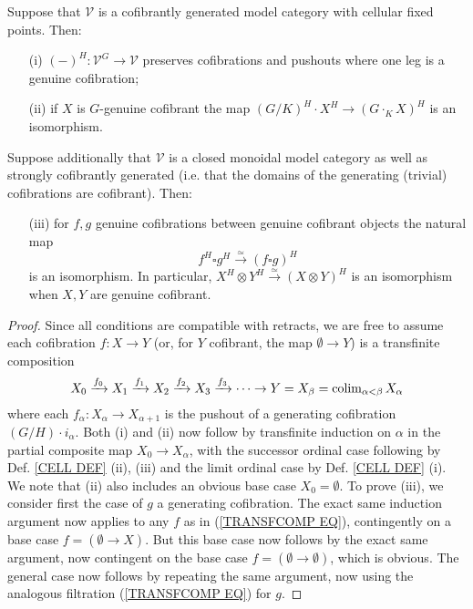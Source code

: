 \documentclass[a4paper,10pt]{article}%
\begin{document}
\begin{proposition}\label{STRONGCELL PROP}
	Suppose that $\mathcal{V}$ is a cofibrantly generated model category with cellular fixed points. Then:
	\begin{itemize}
		\item[(i)] $(\minus)^H \colon \mathcal{V}^G \to \mathcal{V}$ preserves cofibrations and pushouts where one leg
			 is a genuine cofibration;
		\item[(ii)] if $X$ is $G$-genuine cofibrant the map 
			$(G/K)^H \cdot X^H \to (G \cdot_K X)^H$ is an isomorphism.
	\end{itemize}
Suppose additionally that $\mathcal{V}$ is a 
closed monoidal model category
as well as strongly cofibrantly generated
(i.e. that the domains of the generating (trivial) cofibrations are cofibrant). Then:
	\begin{itemize}
		\item[(iii)] for $f,g$ genuine cofibrations between genuine cofibrant objects the natural map 
\[f^H \square g^H \xrightarrow{\simeq} (f \square g)^H\]
 is an isomorphism.
 In particular, $X^H \otimes Y^H \xrightarrow{\simeq} 
 (X \otimes Y)^H$ is an isomorphism when $X,Y$ are genuine cofibrant.
	\end{itemize}
\end{proposition}


\begin{proof}
Since all conditions are compatible with retracts, we are free to assume each cofibration $f\colon X \to Y$
(or, for $Y$ cofibrant, the map $\emptyset \to Y$)
is a transfinite composition
\begin{equation}\label{TRANSFCOMP EQ}
	X_0 \xrightarrow{f_0} 
	X_1 \xrightarrow{f_1}
	X_2 \xrightarrow{f_2}
	X_3 \xrightarrow{f_3} 
	\cdots
	\to Y = X_{\beta} = \operatorname{colim}_{\alpha < \beta} X_{\alpha}
\end{equation}
where each $f_{\alpha} \colon X_{\alpha} \to X_{\alpha+1}$
is the pushout of a generating cofibration
$(G/H) \cdot i_{\alpha}$. Both (i) and (ii) now follow by transfinite induction on $\alpha$ in the partial composite map
$X_0 \to X_{\alpha}$, with the successor ordinal case following by Def. \ref{CELL DEF} (ii), (iii) and the limit ordinal case by
Def. \ref{CELL DEF} (i). We note that (ii) also includes an obvious base case $X_0=\emptyset$.
To prove (iii), we consider first the case of $g$ a generating cofibration. The exact same induction argument now applies to any $f$ as in (\ref{TRANSFCOMP EQ}), contingently on a base case $f=(\emptyset \to X)$. But this base case now follows by the exact same argument, now contingent on the base case $f=(\emptyset \to \emptyset)$, which is obvious.
The general case now follows by repeating the same argument, now using the analogous filtration (\ref{TRANSFCOMP EQ}) for $g$.
\end{proof}
\end{document}

